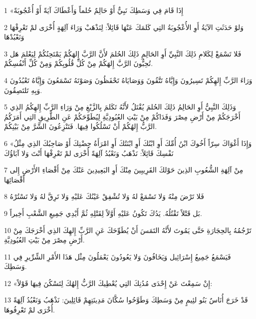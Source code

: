 \par 1 «إِذَا قَامَ فِي وَسَطِكَ نَبِيٌّ أَوْ حَالِمٌ حُلماً وَأَعْطَاكَ آيَةً أَوْ أُعْجُوبَةً
\par 2 وَلوْ حَدَثَتِ الآيَةُ أَوِ الأُعْجُوبَةُ التِي كَلمَكَ عَنْهَا قَائِلاً: لِنَذْهَبْ وَرَاءَ آلِهَةٍ أُخْرَى لمْ تَعْرِفْهَا وَنَعْبُدْهَا
\par 3 فَلا تَسْمَعْ لِكَلامِ ذَلِكَ النَّبِيِّ أَوِ الحَالِمِ ذَلِكَ الحُلمَ لأَنَّ الرَّبَّ إِلهَكُمْ يَمْتَحِنُكُمْ لِيَعْلمَ هَل تُحِبُّونَ الرَّبَّ إِلهَكُمْ مِنْ كُلِّ قُلُوبِكُمْ وَمِنْ كُلِّ أَنْفُسِكُمْ.
\par 4 وَرَاءَ الرَّبِّ إِلهِكُمْ تَسِيرُونَ وَإِيَّاهُ تَتَّقُونَ وَوَصَايَاهُ تَحْفَظُونَ وَصَوْتَهُ تَسْمَعُونَ وَإِيَّاهُ تَعْبُدُونَ وَبِهِ تَلتَصِقُونَ.
\par 5 وَذَلِكَ النَّبِيُّ أَوِ الحَالِمُ ذَلِكَ الحُلمَ يُقْتَلُ لأَنَّهُ تَكَلمَ بِالزَّيْغِ مِنْ وَرَاءِ الرَّبِّ إِلهِكُمُ الذِي أَخْرَجَكُمْ مِنْ أَرْضِ مِصْرَ وَفَدَاكُمْ مِنْ بَيْتِ العُبُودِيَّةِ لِيُطَوِّحَكُمْ عَنِ الطَّرِيقِ التِي أَمَرَكُمُ الرَّبُّ إِلهُكُمْ أَنْ تَسْلُكُوا فِيهَا. فَتَنْزِعُونَ الشَّرَّ مِنْ بَيْنِكُمْ.
\par 6 «وَإِذَا أَغْوَاكَ سِرّاً أَخُوكَ ابْنُ أُمِّكَ أَوِ ابْنُكَ أَوِ ابْنَتُكَ أَوِ امْرَأَةُ حِضْنِكَ أَوْ صَاحِبُكَ الذِي مِثْلُ نَفْسِكَ قَائِلاً: نَذْهَبُ وَنَعْبُدُ آلِهَةً أُخْرَى لمْ تَعْرِفْهَا أَنْتَ وَلا آبَاؤُكَ
\par 7 مِنْ آلِهَةِ الشُّعُوبِ الذِينَ حَوْلكَ القَرِيبِينَ مِنْكَ أَوِ البَعِيدِينَ عَنْكَ مِنْ أَقْصَاءِ الأَرْضِ إِلى أَقْصَائِهَا
\par 8 فَلا تَرْضَ مِنْهُ وَلا تَسْمَعْ لهُ وَلا تُشْفِقْ عَيْنُكَ عَليْهِ وَلا تَرِقَّ لهُ وَلا تَسْتُرْهُ
\par 9 بَل قَتْلاً تَقْتُلُهُ. يَدُكَ تَكُونُ عَليْهِ أَوَّلاً لِقَتْلِهِ ثُمَّ أَيْدِي جَمِيعِ الشَّعْبِ أَخِيراً.
\par 10 تَرْجُمُهُ بِالحِجَارَةِ حَتَّى يَمُوتَ لأَنَّهُ التَمَسَ أَنْ يُطَوِّحَكَ عَنِ الرَّبِّ إِلهِكَ الذِي أَخْرَجَكَ مِنْ أَرْضِ مِصْرَ مِنْ بَيْتِ العُبُودِيَّةِ.
\par 11 فَيَسْمَعُ جَمِيعُ إِسْرَائِيل وَيَخَافُونَ وَلا يَعُودُونَ يَعْمَلُونَ مِثْل هَذَا الأَمْرِ الشِّرِّيرِ فِي وَسَطِكَ.
\par 12 «إِنْ سَمِعْتَ عَنْ إِحْدَى مُدُنِكَ التِي يُعْطِيكَ الرَّبُّ إِلهُكَ لِتَسْكُنَ فِيهَا قَوْلاً:
\par 13 قَدْ خَرَجَ أُنَاسٌ بَنُو لئِيمٍ مِنْ وَسَطِكَ وَطَوَّحُوا سُكَّانَ مَدِينَتِهِمْ قَائِلِينَ: نَذْهَبُ وَنَعْبُدُ آلِهَةً أُخْرَى لمْ تَعْرِفُوهَا.
